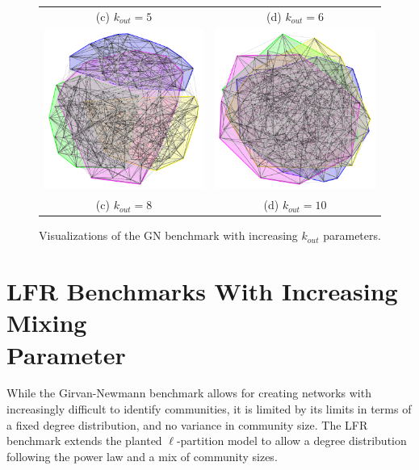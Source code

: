 \begin{figure}
\begin{tabular}{cc}
		(c) $k_{out}=5$ & (d) $k_{out}=6$ \\[6pt]
		\includegraphics[width=65mm]{images/girvan_kout_8_0.png} &   \includegraphics[width=65mm]{images/girvan_kout_10_0.png} \\
		(c) $k_{out}=8$ & (d) $k_{out}=10$ \\[6pt]
		
	\end{tabular}
	\caption{Visualizations of the GN benchmark with increasing $k_{out}$ parameters.}
\end{figure}



\section{LFR Benchmarks With Increasing Mixing \\ Parameter}
While the Girvan-Newmann benchmark allows for creating networks with increasingly difficult to identify communities, it is limited by its limits in terms of a fixed degree distribution, and no variance in community size. The LFR benchmark extends the planted $\ell$-partition model to allow a degree distribution following the power law and a mix of community sizes.

